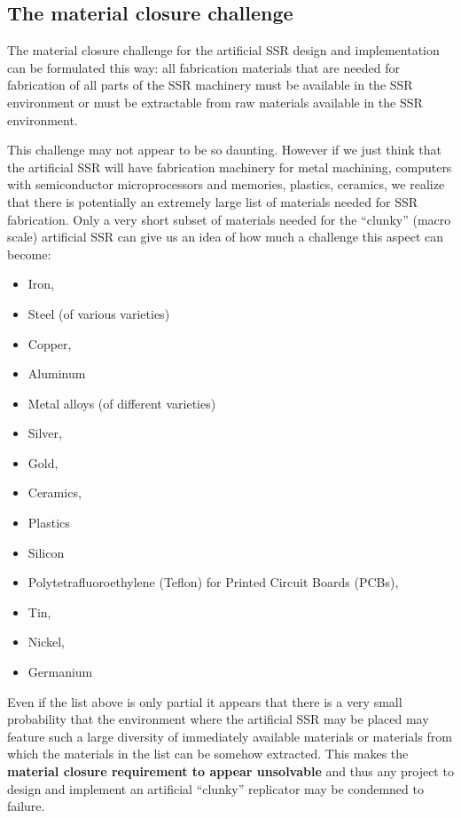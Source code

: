 \subsection[The material closure challenge]{The material closure
challenge}
\hypertarget{RefHeading3140306210128}{}The material closure challenge
for the artificial SSR design and implementation can be formulated this
way: all fabrication materials that are needed for fabrication of all
parts of the SSR machinery must be available in the SSR environment or
must be extractable from raw materials available in the SSR
environment.

This challenge may not appear to be so daunting. However if we just
think that the artificial SSR will have fabrication machinery for metal
machining, computers with semiconductor microprocessors and memories,
plastics, ceramics, we realize that there is potentially an extremely
large list of materials needed for SSR fabrication. Only a very short
subset of materials needed for the “clunky” (macro scale) artificial
SSR can give us an idea of how much a challenge this aspect can become:

\begin{itemize}
\item Iron,
\item Steel (of various varieties)
\item Copper,
\item Aluminum
\item Metal alloys (of different varieties)
\item Silver,
\item Gold,
\item Ceramics,
\item Plastics
\item Silicon
\item Polytetrafluoroethylene (Teflon) for Printed Circuit Boards
(PCBs),
\item Tin,
\item Nickel,
\item Germanium
\end{itemize}

Even if the list above is only partial it appears that there is a very
small probability that the environment where the artificial SSR may be
placed may feature such a large diversity of immediately available
materials or materials from which the materials in the list can be
somehow extracted. This makes the \textbf{material closure requirement
to appear unsolvable} and thus any project to design and implement an
artificial “clunky” replicator may be condemned to failure. 

